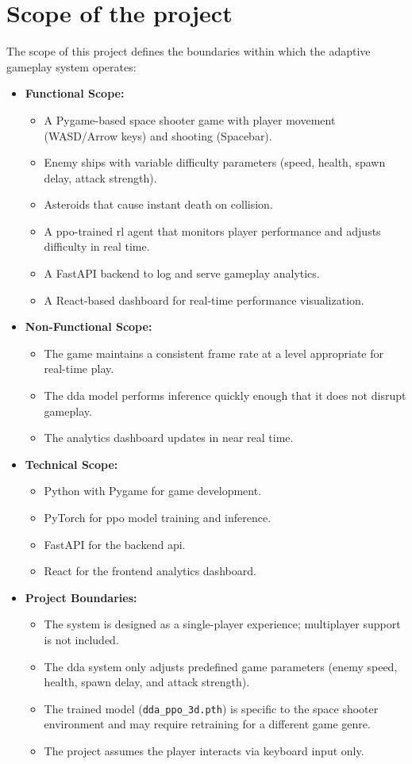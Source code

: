 \section{Scope of the project}
The scope of this project defines the boundaries within which the adaptive gameplay system operates:

\begin{itemize}
	\item \textbf{Functional Scope:}
		\begin{itemize}
			\item A Pygame-based space shooter game with player movement (WASD/Arrow keys) and shooting (Spacebar).
			\item Enemy ships with variable difficulty parameters (speed, health, spawn delay, attack strength).
			\item Asteroids that cause instant death on collision.
			\item A \ac{ppo}-trained \ac{rl} agent that monitors player performance and adjusts difficulty in real time.
			\item A FastAPI backend to log and serve gameplay analytics.
			\item A React-based dashboard for real-time performance visualization.
		\end{itemize}
	\item \textbf{Non-Functional Scope:}
		\begin{itemize}
			\item The game maintains a consistent frame rate at a level appropriate for real-time play.
			\item The \ac{dda} model performs inference quickly enough that it does not disrupt gameplay.
			\item The analytics dashboard updates in near real time.
		\end{itemize}
	\item \textbf{Technical Scope:}
		\begin{itemize}
			\item Python with Pygame for game development.
			\item PyTorch for \ac{ppo} model training and inference.
			\item FastAPI for the backend \ac{api}.
			\item React for the frontend analytics dashboard.
		\end{itemize}
	\item \textbf{Project Boundaries:}
		\begin{itemize}
			\item The system is designed as a single-player experience; multiplayer support is not included.
			\item The \ac{dda} system only adjusts predefined game parameters (enemy speed, health, spawn delay, and attack strength).
			\item The trained model (\texttt{dda\_ppo\_3d.pth}) is specific to the space shooter environment and may require retraining for a different game genre.
			\item The project assumes the player interacts via keyboard input only.
		\end{itemize}
\end{itemize}
